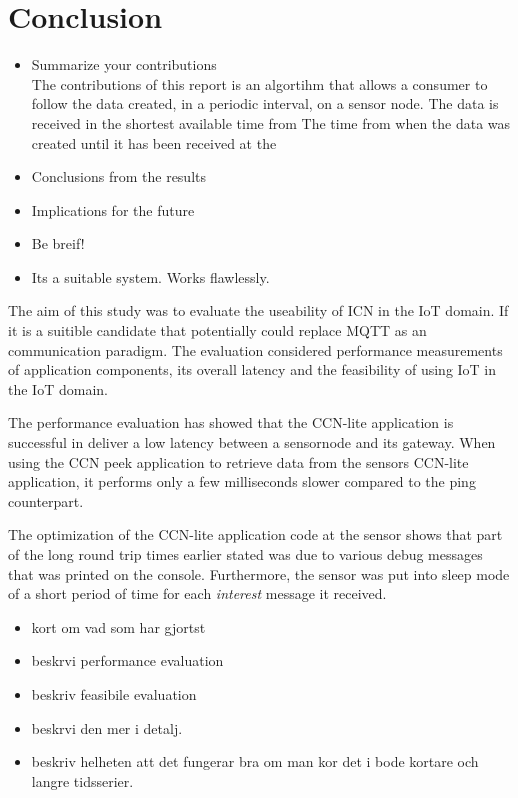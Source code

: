 \section{Conclusion}

\begin{itemize}
\item Summarize your contributions\\
The contributions of this report is an algortihm that allows a consumer to follow the data created, in a periodic interval, on a sensor node. 
The data is received in the shortest available time from 
The time from when the data was created until it has been received at the 

\item Conclusions from the results
\item Implications for the future 
\item Be breif!

\item Its a suitable system. Works flawlessly.
\end{itemize} 

The aim of this study was to evaluate the useability of ICN in the IoT domain. If it is a suitible candidate that potentially could replace MQTT as an communication paradigm.
The evaluation considered performance measurements of application components, its overall latency and the feasibility of using IoT in the IoT domain.

The performance evaluation has showed that the CCN-lite application is successful in deliver a low latency between a sensornode and its gateway. 
When using the CCN peek application to retrieve data from the sensors CCN-lite application, it performs only a few milliseconds slower compared to the ping counterpart.

The optimization of the CCN-lite application code at the sensor shows that part of the long round trip times earlier stated was due to various debug messages that was printed on the console. Furthermore, the sensor was put into sleep mode of a short period of time for each \textit{interest} message it received. 

\begin{itemize}
\item kort om vad som har gjortst
\item beskrvi performance evaluation
\item beskriv feasibile evaluation
\item beskrvi den mer i detalj.
\item beskriv helheten att det fungerar bra om man kor det i bode kortare och langre tidsserier.
\end{itemize}



